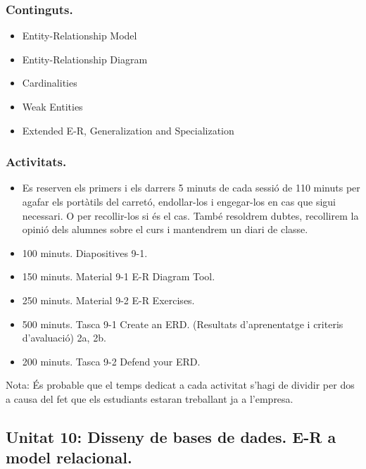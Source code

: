 \documentclass[catalan, a4paper, 12pt, titlepage]{article}
\begin{document}
  \subsubsection{Continguts.}
  \begin{itemize}
	  \item Entity-Relationship Model
	  \item Entity-Relationship Diagram
	  \item Cardinalities
	  \item Weak Entities
	  \item Extended E-R, Generalization and Specialization
  \end{itemize}

  \subsubsection{Activitats.}
  \begin{itemize}
          \item Es reserven els primers i els darrers 5 minuts de cada sessió de 110 minuts per agafar els portàtils del carretó, endollar-los i engegar-los en cas que sigui necessari. O per recollir-los si és el cas. També resoldrem dubtes, recollirem la opinió dels alumnes sobre el curs i mantendrem un diari de classe.
	  \item 100 minuts. Diapositives 9-1.
	  \item 150 minuts. Material 9-1 E-R Diagram Tool.
	  \item 250 minuts. Material 9-2 E-R Exercises.
	  \item 500 minuts. Tasca 9-1 Create an ERD. (\faGraduationCap Resultats d'aprenentatge i criteris d'avaluació) 2a, 2b.
	  \item 200 minuts. Tasca 9-2 Defend your ERD.
  \end{itemize}

  Nota: És probable que el temps dedicat a cada activitat s'hagi de dividir per dos a causa del fet que els estudiants estaran treballant ja a l'empresa.

  \subsection{Unitat 10: Disseny de bases de dades. E-R a model relacional.}
\end{document}
